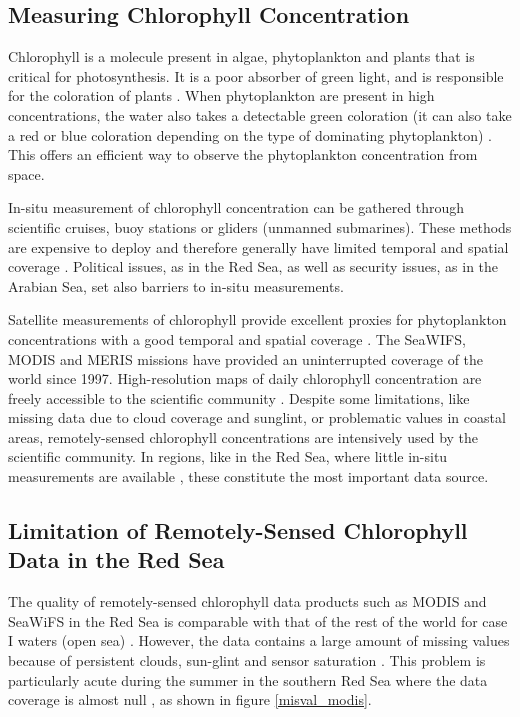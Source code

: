 \subsection{Measuring Chlorophyll Concentration}

Chlorophyll is a molecule present in algae, phytoplankton and plants that is
critical for photosynthesis. It is a poor absorber of green light, and is
responsible for the coloration of plants \citep{Pal2014}. When phytoplankton
are present in high concentrations, the water also takes a detectable green
coloration (it can also take a red or blue coloration depending on the type of
dominating phytoplankton) \citep{Robinson2010}. This offers an efficient way to
observe the phytoplankton concentration from space.

In-situ measurement of chlorophyll concentration can be gathered through
scientific cruises, buoy stations or gliders (unmanned submarines). These
methods are expensive to deploy and therefore generally have limited temporal
and spatial coverage \citep{Robinson2010}. Political issues, as in the Red Sea,
as well as security issues, as in the Arabian Sea, set also barriers to in-situ
measurements.

Satellite measurements of chlorophyll provide excellent proxies for
phytoplankton concentrations with a good temporal and spatial coverage
\citep{Robinson2010}. The SeaWIFS, MODIS and MERIS missions have provided an
uninterrupted coverage of the world since 1997. High-resolution maps of daily
chlorophyll concentration are freely accessible to the scientific community
\citep{McClain2009}. Despite some limitations, like missing data due to cloud
coverage and sunglint, or problematic values in coastal areas, remotely-sensed
chlorophyll concentrations are intensively used by the scientific community. In
regions, like in the Red Sea, where little in-situ measurements are available
\citep{Raitsos2013, Brewin2013}, these constitute the most important data
source.

\subsection{Limitation of Remotely-Sensed Chlorophyll Data in the Red Sea}

The quality of remotely-sensed chlorophyll data products such as MODIS and
SeaWiFS in the Red Sea is comparable with that of the rest of the world for
case I waters (open sea) \citep{Brewin2013}. However, the data contains a large
amount of missing values because of persistent clouds, sun-glint and sensor
saturation \citep{Racault}. This problem is particularly acute during the
summer in the southern Red Sea where the data coverage is almost null
\citep{Racault}, as shown in figure \ref{misval_modis}.

